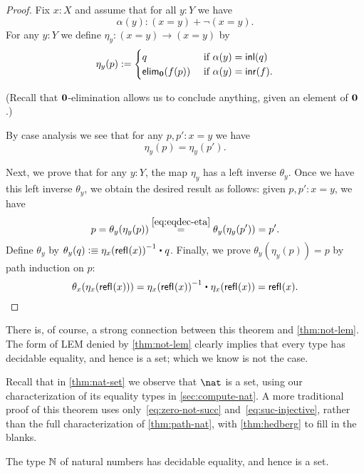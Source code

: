 \begin{proof}
Fix $x : X$ and assume that for all $y : Y$ we have
  \[\alpha(y) : (x = y) + \neg (x = y). \]
  For any $y : Y$ we define
      $  \eta_y : (x = y) \to (x = y) $
    by
    \[ \eta_y(p) := \begin{cases}
                     q & \text{ if } \alpha(y) = \mathsf{inl}(q) \\
                     \mathsf{elim}_\mathbf{0}(f(p)) & \text{ if } \alpha(y) = \mathsf{inr}(f).
                    \end{cases}
\]

(Recall that $\mathbf{0}$-elimination allows us to conclude anything, given an element of $\mathbf{0}$.)

\noindent
 By case analysis we see that for any $p, p' : x = y$ we have
 \begin{equation}\eta_y(p) = \eta_y(p') . \label{eq:eqdec-eta}\end{equation}

 \noindent
 Next, we prove that for any $y : Y$, the map $\eta_y$ has a left inverse $\theta_y$.
   Once we have this left inverse $\theta_y$, we obtain the desired result as follows: given
     $p, p' : x = y$, we have
   \[ p = \theta_y (\eta_y(p)) \stackrel{\eqref{eq:eqdec-eta}}{=} \theta_y (\eta_y(p')) = p' . \]
 Define $\theta_y$ by
     $\theta_y(q) \defeq \opp{\eta_x(\refl{}(x))} \ct q$.
  Finally, we prove $\theta_y(\eta_y(p)) = p$ by path induction on $p$:
   \[\theta_x(\eta_x(\refl{}(x))) = \opp{\eta_x(\refl{}(x))} \ct \eta_x(\refl{}(x)) = \refl{}(x). \qedhere \]
\end{proof}

There is, of course, a strong connection between this theorem and \autoref{thm:not-lem}.
The form of LEM denied by \autoref{thm:not-lem} clearly implies that every type has decidable equality, and hence is a set; which we know is not the case.

Recall that in \autoref{thm:nat-set} we observe that $\nat$ is a set, using our characterization of its equality types in \autoref{sec:compute-nat}.
A more traditional proof of this theorem uses only~\eqref{eq:zero-not-succ} and~\eqref{eq:suc-injective}, rather than the full characterization of \autoref{thm:path-nat}, with \autoref{thm:hedberg} to fill in the blanks.

\begin{thm}\label{prop:nat-is-set}
 The type $\mathbb{N}$ of natural numbers has decidable equality, and hence is a set.
\end{thm}

